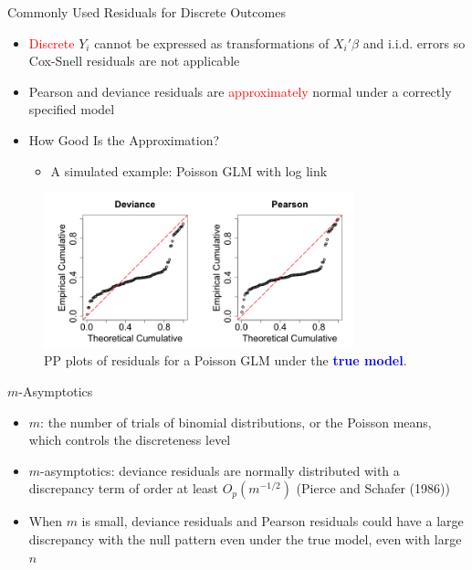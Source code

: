\documentclass[
  ignorenonframetext,
]{beamer}
\providecommand{\tightlist}{%
  \setlength{\itemsep}{0pt}\setlength{\parskip}{0pt}}
\begin{document}
\begin{frame}{Commonly Used Residuals for Discrete Outcomes}
\protect\hypertarget{commonly-used-residuals-for-discrete-outcomes}{}
\begin{itemize}
\item  \textcolor{red}{Discrete} $Y_i$ cannot be expressed as transformations of $X_i'\beta$  and i.i.d. errors so Cox-Snell residuals are not applicable

    \item Pearson and deviance residuals are \textcolor{red}{approximately} normal under a correctly specified model
\item How Good Is the Approximation?
\begin{itemize}
    
    \item A simulated example: Poisson GLM with log link
\end{itemize}
\end{itemize}
\vspace{-0.1in}
\begin{figure}[h]
\includegraphics[width=0.8\textwidth]{figures/poisson2coefslides2}
\caption{PP plots of residuals for a Poisson GLM  under the \textcolor{blue}{\textbf{true model}}.}
\end{figure}
\end{frame}

\begin{frame}{\(m\)-Asymptotics}
\protect\hypertarget{m-asymptotics}{}
\begin{itemize}
\tightlist
\item
  \(m\): the number of trials of binomial distributions, or the Poisson
  means, which controls the discreteness level \vspace{0.2in}
\item
  \(m\)-asymptotics: deviance residuals are normally distributed with a
  discrepancy term of order at least \(O_p(m^{-1/2})\) (Pierce and
  Schafer (1986)) \vspace{0.2in}
\item
  When \(m\) is small, deviance residuals and Pearson residuals could
  have a large discrepancy with the null pattern even under the true
  model, even with large \(n\)
\end{itemize}
\end{frame}
\end{document}
